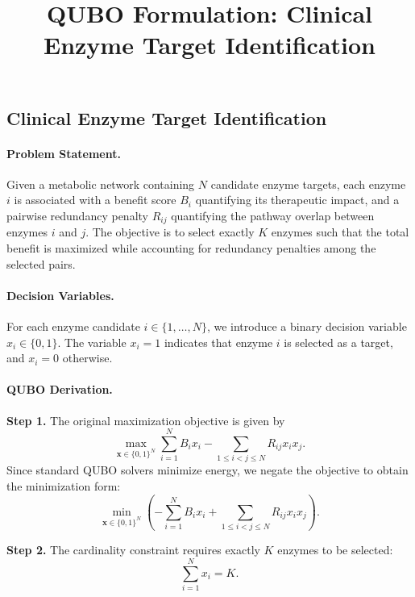 \documentclass[12pt]{article}
\title{QUBO Formulation: Clinical Enzyme Target Identification}
\date{}
\begin{document}
\maketitle

\subsection*{Clinical Enzyme Target Identification}

\paragraph{Problem Statement.}
Given a metabolic network containing $N$ candidate enzyme targets, each enzyme $i$ is associated with a benefit score $B_i$ quantifying its therapeutic impact, and a pairwise redundancy penalty $R_{ij}$ quantifying the pathway overlap between enzymes $i$ and $j$. The objective is to select exactly $K$ enzymes such that the total benefit is maximized while accounting for redundancy penalties among the selected pairs.

\paragraph{Decision Variables.}
For each enzyme candidate $i \in \{1, \dots, N\}$, we introduce a binary decision variable $x_i \in \{0, 1\}$. The variable $x_i = 1$ indicates that enzyme $i$ is selected as a target, and $x_i = 0$ otherwise.

\paragraph{QUBO Derivation.}
\textbf{Step 1.} The original maximization objective is given by
\begin{equation}
  \max_{\mathbf{x} \in \{0,1\}^N} \sum_{i=1}^N B_i x_i - \sum_{1 \le i < j \le N} R_{ij} x_i x_j.
\end{equation}
Since standard QUBO solvers minimize energy, we negate the objective to obtain the minimization form:
\begin{equation}
  \min_{\mathbf{x} \in \{0,1\}^N} \left( -\sum_{i=1}^N B_i x_i + \sum_{1 \le i < j \le N} R_{ij} x_i x_j \right).
\end{equation}

\textbf{Step 2.} The cardinality constraint requires exactly $K$ enzymes to be selected:
\begin{equation}
  \sum_{i=1}^N x_i = K.
\end{equation}
\end{document}
